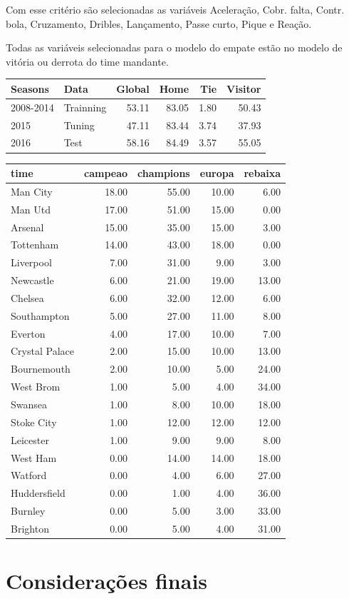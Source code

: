 \documentclass[doc,apacite,oneside,a4paper,12pt]{apa6}
\begin{document}
 
Com esse critério são selecionadas as variáveis Aceleração, Cobr. falta, Contr. bola, Cruzamento, Dribles, Lançamento, Passe curto, Pique e  Reação. 

Todas as variáveis selecionadas para o modelo do empate estão no modelo de vitória ou derrota do time mandante.


\begin{table}[ht]
\centering
\begin{tabular}{llrrrr}
  \hline
Seasons & Data & Global & Home & Tie & Visitor \\ 
  \hline
2008-2014 & Trainning & 53.11 & 83.05 & 1.80 & 50.43 \\ 
  2015 & Tuning & 47.11 & 83.44 & 3.74 & 37.93 \\ 
  2016 & Test & 58.16 & 84.49 & 3.57 & 55.05 \\ 
   \hline
\end{tabular}
\end{table}



\begin{table}[ht]
\centering
\begin{tabular}{lrrrr}
  \hline
time & campeao & champions & europa & rebaixa \\ 
  \hline
Man City & 18.00 & 55.00 & 10.00 & 6.00 \\ 
  Man Utd & 17.00 & 51.00 & 15.00 & 0.00 \\ 
  Arsenal & 15.00 & 35.00 & 15.00 & 3.00 \\ 
  Tottenham & 14.00 & 43.00 & 18.00 & 0.00 \\ 
  Liverpool & 7.00 & 31.00 & 9.00 & 3.00 \\ 
  Newcastle & 6.00 & 21.00 & 19.00 & 13.00 \\ 
  Chelsea & 6.00 & 32.00 & 12.00 & 6.00 \\ 
  Southampton & 5.00 & 27.00 & 11.00 & 8.00 \\ 
  Everton & 4.00 & 17.00 & 10.00 & 7.00 \\ 
  Crystal Palace & 2.00 & 15.00 & 10.00 & 13.00 \\ 
  Bournemouth & 2.00 & 10.00 & 5.00 & 24.00 \\ 
  West Brom & 1.00 & 5.00 & 4.00 & 34.00 \\ 
  Swansea & 1.00 & 8.00 & 10.00 & 18.00 \\ 
  Stoke City & 1.00 & 12.00 & 12.00 & 12.00 \\ 
  Leicester & 1.00 & 9.00 & 9.00 & 8.00 \\ 
  West Ham & 0.00 & 14.00 & 14.00 & 18.00 \\ 
  Watford & 0.00 & 4.00 & 6.00 & 27.00 \\ 
  Huddersfield & 0.00 & 1.00 & 4.00 & 36.00 \\ 
  Burnley & 0.00 & 5.00 & 3.00 & 33.00 \\ 
  Brighton & 0.00 & 5.00 & 4.00 & 31.00 \\ 
   \hline
\end{tabular}
\end{table}

\section{Considerações finais}
\label{sec:conclu}
\noindent



\end{document}
